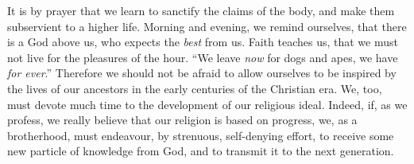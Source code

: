 It is by prayer that we learn to
sanctify the claims of the body, and make
them subservient to a higher life. Morning
and evening, we remind ourselves, that there
is a God above us, who expects the \textsl{best} from
us. Faith teaches us, that we must not live
for the pleasures of the hour. “We leave
\textsl{now} for dogs and apes, we have \textsl{for ever}.”
Therefore we should not be afraid to allow
ourselves to be inspired by the lives of our
ancestors in the early centuries of the
Christian era. We, too, must devote much
time to the development of our religious
ideal. Indeed, if, as we profess, we really
believe that our religion is based on progress,
we, as a brotherhood, must endeavour, by
strenuous, self-denying effort, to receive some
new particle of knowledge from God, and to
transmit it to the next generation.

